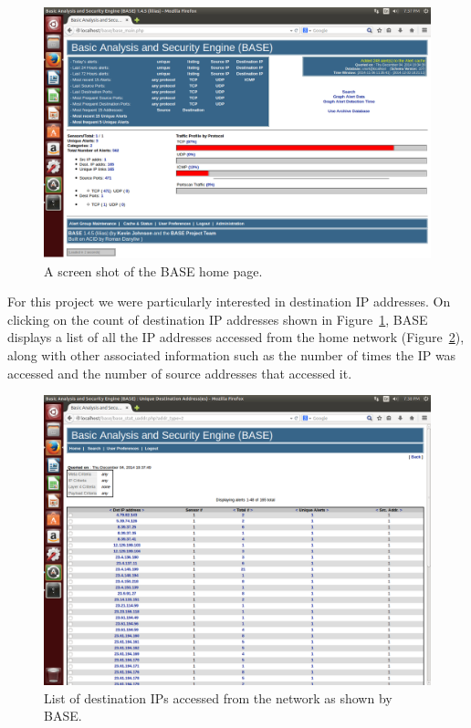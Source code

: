 \begin{figure}[!t]
    \centering
    \includegraphics[width=2\columnwidth]{figures/R2_BASE_Main}
    \caption{A screen shot of the BASE home page.}
    \label{fig:r2}
\end{figure}

For this project we were particularly interested in destination IP
addresses.
%
On clicking on the count of destination IP addresses shown in
Figure~\ref{fig:r2}, BASE displays a list of all the IP addresses accessed from
the home network (Figure~\ref{fig:r3}), along with other associated information
such as the number of times the IP was accessed and the number of source
addresses that accessed it.

\begin{figure}[!tb]
    \centering
    \includegraphics[width=2\columnwidth]{figures/R3_BASE_IPList}
    \caption{List of destination IPs accessed from the network as shown by
    BASE.}
    \label{fig:r3}
\end{figure}

